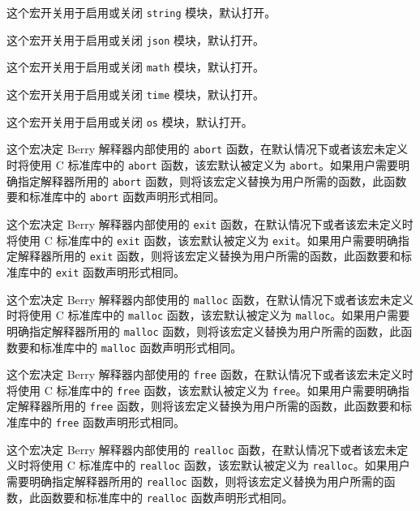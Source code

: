 
这个宏开关用于启用或关闭 \texttt{string} 模块，默认打开。


这个宏开关用于启用或关闭 \texttt{json} 模块，默认打开。


这个宏开关用于启用或关闭 \texttt{math} 模块，默认打开。


这个宏开关用于启用或关闭 \texttt{time} 模块，默认打开。


这个宏开关用于启用或关闭 \texttt{os} 模块，默认打开。


这个宏决定 Berry 解释器内部使用的 \texttt{abort} 函数，在默认情况下或者该宏未定义时将使用 C 标准库中的 \texttt{abort} 函数，该宏默认被定义为 \texttt{abort}。如果用户需要明确指定解释器所用的 \texttt{abort} 函数，则将该宏定义替换为用户所需的函数，此函数要和标准库中的 \texttt{abort} 函数声明形式相同。


这个宏决定 Berry 解释器内部使用的 \texttt{exit} 函数，在默认情况下或者该宏未定义时将使用 C 标准库中的 \texttt{exit} 函数，该宏默认被定义为 \texttt{exit}。如果用户需要明确指定解释器所用的 \texttt{exit} 函数，则将该宏定义替换为用户所需的函数，此函数要和标准库中的 \texttt{exit} 函数声明形式相同。


这个宏决定 Berry 解释器内部使用的 \texttt{malloc} 函数，在默认情况下或者该宏未定义时将使用 C 标准库中的 \texttt{malloc} 函数，该宏默认被定义为 \texttt{malloc}。如果用户需要明确指定解释器所用的 \texttt{malloc} 函数，则将该宏定义替换为用户所需的函数，此函数要和标准库中的 \texttt{malloc} 函数声明形式相同。


这个宏决定 Berry 解释器内部使用的 \texttt{free} 函数，在默认情况下或者该宏未定义时将使用 C 标准库中的 \texttt{free} 函数，该宏默认被定义为 \texttt{free}。如果用户需要明确指定解释器所用的 \texttt{free} 函数，则将该宏定义替换为用户所需的函数，此函数要和标准库中的 \texttt{free} 函数声明形式相同。


这个宏决定 Berry 解释器内部使用的 \texttt{realloc} 函数，在默认情况下或者该宏未定义时将使用 C 标准库中的 \texttt{realloc} 函数，该宏默认被定义为 \texttt{realloc}。如果用户需要明确指定解释器所用的 \texttt{realloc} 函数，则将该宏定义替换为用户所需的函数，此函数要和标准库中的 \texttt{realloc} 函数声明形式相同。

